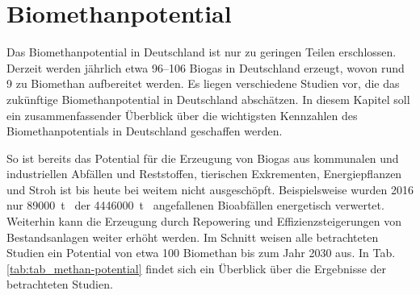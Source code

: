 \section{Biomethanpotential}

Das Biomethanpotential in Deutschland ist nur zu geringen Teilen erschlossen. Derzeit werden jährlich etwa \SIrange{96}{106}{\twhHs} Biogas in Deutschland erzeugt, wovon rund \SI{9}{\twhHs} zu Biomethan aufbereitet werden. Es liegen verschiedene Studien vor, die das zukünftige Biomethanpotential in Deutschland abschätzen. In diesem Kapitel soll ein zusammenfassender Überblick über die wichtigsten Kennzahlen des Biomethanpotentials in Deutschland geschaffen werden. \smallskip

So ist bereits das Potential für die Erzeugung von Biogas aus kommunalen und industriellen Abfällen und Reststoffen, tierischen Exkrementen, Energiepflanzen und Stroh ist bis heute bei weitem nicht ausgeschöpft. Beispielsweise wurden \SI{2016}{\relax} nur \SI[per-mode=symbol]{89000}{\tonne\peranno} der \SI[per-mode=symbol]{4446000}{\tonne\peranno} angefallenen Bioabfällen energetisch verwertet. Weiterhin kann die Erzeugung durch Repowering und Effizienzsteigerungen von Bestandsanlagen weiter erhöht werden. Im Schnitt weisen alle betrachteten Studien ein Potential von etwa \SI{100}{\twhHs} Biomethan bis zum Jahr 2030 aus. In Tab. \ref{tab:tab_methan-potential} findet sich ein Überblick über die Ergebnisse der betrachteten Studien. \parencite{BDEW2019a} \parencite{dena2017} \parencite{WIKUE2006}

